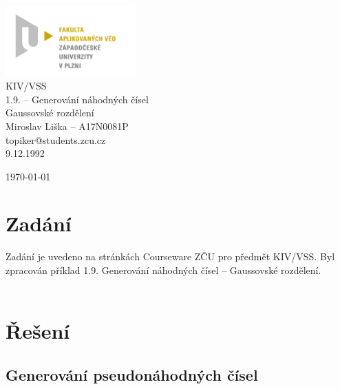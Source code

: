 \documentclass{article}
\begin{document}


\begin{titlepage}	
	\begin{center}
		\includegraphics[width=5cm]{logo.jpg}\\[3.5cm]
		{\Huge KIV/VSS}\\[0.5cm]
		{\Large 1.9. – Generování náhodných čísel}\\[0.5cm]
		{\large  Gaussovské rozdělení}\\[4.5cm]
		{\large  Miroslav Liška – A17N0081P}\\[0.5cm]
		{\large  topiker@students.zcu.cz}\\[0.5cm]
		{\large   9.12.1992}\\[0.5cm]
		\vfill

		{\large \today}

	\end{center}
\end{titlepage}



\section{Zadání} %
\setcounter{page}{1}
Zadání je uvedeno na stránkách Courseware ZČU pro předmět KIV/VSS. Byl zpracován příklad 1.9. Generování náhodných čísel – Gaussovské rozdělení.\\\\
 
\section{Řešení}%


 \subsection{Generování pseudonáhodných čísel}%
\end{document}
